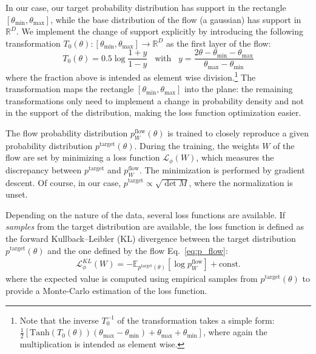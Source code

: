 \documentclass[twocolumn,showpacs,preprintnumbers,nofootinbib,prd,
superscriptaddress,10pt]{revtex4-2}
\begin{document}
In our case, our target probability distribution has support in the rectangle $[\theta_\text{min}, \theta_\text{max}]$, while the base distribution of the flow (a gaussian) has support in $\mathbb{R}^D$. We implement the change of support explicitly by introducing the following transformation $T_0(\theta): [\theta_\text{min}, \theta_\text{max}] \to \mathbb{R}^D$ as the first layer of the flow:
%
\begin{equation}\label{eq:first_transform}
	T_0(\theta) = 0.5 \log \frac{1 + y}{1 - y} \;\;\; \text{with} \;\;\; y = \frac{2\theta - \theta_\text{min} - \theta_\text{max}}{\theta_\text{max}- \theta_\text{min}}
\end{equation}
where the fraction above is intended as element wise division.\footnote{
Note that the inverse $T_0^{-1}$ of the transformation takes a simple form: $\frac{1}{2} [\text{Tanh}(T_0(\theta))(\theta_\text{max} - \theta_\text{min})+\theta_\text{max}+ \theta_\text{min}]$, where again the multiplication is intended as element wise.
}
The transformation maps the rectangle $[\theta_\text{min}, \theta_\text{max}]$ into the plane: the remaining transformations only need to implement a change in probability density and not in the support of the distribution, making the loss function optimization easier.

The flow probability distribution $p^\text{flow}_W(\theta)$ is trained to closely reproduce a given probability distribution $p^\text{target}(\theta)$.
During the training, the weights $W$ of the flow are set by minimizing a loss function $\mathcal{L}_\phi(W)$, which measures the discrepancy between $p^\text{target}$ and $p^\text{flow}_W$. The minimization is performed by gradient descent.
Of course, in our case, $p^\text{target} \propto \sqrt{\det M}$, where the normalization is unset.

Depending on the nature of the data, several loss functions are available.
If {\it samples} from the target distribution are available, the loss function is defined as the forward Kullback–Leibler (KL) divergence between the target distribution $p^\text{target}(\theta)$ and the one defined by the flow Eq.~\eqref{eq:p_flow}:
\begin{align}
	\mathcal{L}^{KL}_\phi(W) = - \mathbb{E}_{p^\text{target}(\theta)} [\log p^\text{flow}_W] + \text{const.}
\end{align}
where the expected value is computed using empirical samples from $p^\text{target}(\theta)$ to provide a Monte-Carlo estimation of the loss function.
\end{document}
